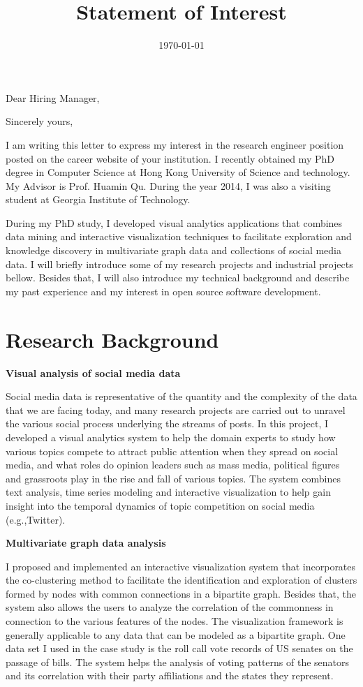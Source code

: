 \documentclass[11pt,a4paper,sans]{moderncv} %
\title{Statement of Interest}
\begin{document}
\date{\today} %
\opening{Dear Hiring Manager,} %
\closing{Sincerely yours,} %
\makelettertitle %

I am writing this letter to express my interest in the research engineer position posted on the career website of your institution. I recently obtained my PhD degree in Computer Science at Hong Kong University of Science and technology. My Advisor is Prof. Huamin Qu. During the year 2014, I was also a visiting student at Georgia Institute of Technology.

During my PhD study, I developed visual analytics applications that combines data mining and interactive visualization techniques to facilitate exploration and knowledge discovery in multivariate graph data and collections of social media data. I will briefly introduce some of my research projects and industrial projects bellow. Besides that, I will also introduce my technical background and describe my past experience and my interest in open source software development. 

\section{Research Background}

\textbf{Visual analysis of social media data}

Social media data is representative of the quantity and the complexity of the data that we are facing today, and many research projects are carried out to unravel the various social process underlying the streams of posts. In this project, I developed a visual analytics system to help the domain experts to study how various topics compete to attract public attention when they spread on social media, and what roles do opinion leaders such as mass media, political figures and grassroots play in the rise and fall of various topics. The system combines text analysis, time series modeling and interactive visualization to help gain insight into the temporal dynamics of topic competition on social media (e.g.,Twitter).

\textbf{Multivariate graph data analysis}

I proposed and implemented an interactive visualization system that incorporates the co-clustering method to facilitate the identification and exploration of clusters formed by nodes with common connections in a bipartite graph. Besides that, the system also allows the users to analyze the correlation of the commonness in connection to the various features of the nodes. The visualization framework is generally applicable to any data that can be modeled as a bipartite graph. One data set I used in the case study is the roll call vote records of US senates on the passage of bills. The system helps the analysis of voting patterns of the senators and its correlation with their party affiliations and the states they represent.
\end{document}
